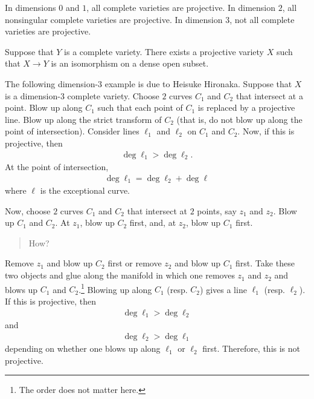 \documentclass [11 pt, oneside] {article}
\begin{document}
In dimensions $0$ and $1$, all complete varieties are projective. In dimension $2$, all nonsingular complete varieties are projective. In dimension $3$, not all complete varieties are projective. 

\begin{lemma}[Chow]\label{chow}\text{}
Suppose that $Y$ is a complete variety. There exists a projective variety $X$ such that $X\longrightarrow Y$ is an isomorphism on a dense open subset. 
\end{lemma}

\begin{example}\label{}\text{}
The following dimension-$3$ example is due to Heisuke Hironaka. Suppose that $X$ is a dimension-$3$ complete variety. Choose $2$ curves $C_1$ and $C_2$ that intersect at a point. Blow up along $C_1$ such that each point of $C_1$ is replaced by a projective line. Blow up along the strict transform of $C_2$  (that is, do not blow up along the point of intersection). Consider lines $\ell_1$ and $\ell_2$ on $C_1$ and $C_2$. Now, if this is projective, then
\begin{align*}
	\deg \ell_1 >\deg \ell_2.
\end{align*}
At the point of intersection,
\begin{align*}
	\deg \ell_1 = \deg \ell_2 + \deg \ell
\end{align*}
where $\ell$ is the exceptional curve.

Now, choose $2$ curves $C_1$ and $C_2$ that intersect at $2$ points, say $z_1$ and $z_2$. Blow up $C_1$ and $C_2$. At $z_1$, blow up $C_2$ first, and, at $z_2$, blow up $C_1$ first. 
\begin{quote}
	\small How?
\end{quote}
Remove $z_1$ and blow up $C_2$ first or remove $z_2$ and blow up $C_1$ first. Take these two objects and glue along the manifold in which one removes $z_1$ and $z_2$ and blows up $C_1$ and $C_2$.\footnote{The order does not matter here.} Blowing up along $C_1$ (resp. $C_2$) gives a line $\ell_1$ (resp. $\ell_2$). If this is projective, then
\begin{align*}
	\deg \ell_1 > \deg \ell_2
\end{align*}
and 
\begin{align*}
	\deg \ell_2 > \deg \ell_1
\end{align*}
depending on whether one blows up along $\ell_1$ or $\ell_2$ first. Therefore, this is not projective.
\end{example}
\end{document}
